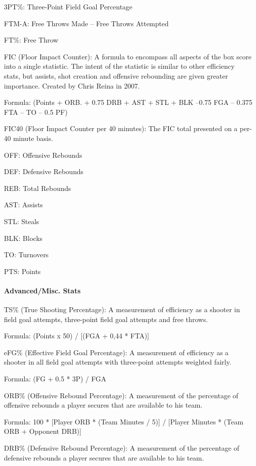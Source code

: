 \documentclass[]{article}
\let\oldparagraph\paragraph
\renewcommand{\paragraph}[1]{\oldparagraph{#1}\mbox{}}
\begin{document}
3PT\%: Three-Point Field Goal Percentage

FTM-A: Free Throws Made -- Free Throws Attempted

FT\%: Free Throw

FIC (Floor Impact Counter): A formula to encompass all aspects of the
box score into a single statistic. The intent of the statistic is
similar to other efficiency stats, but assists, shot creation and
offensive rebounding are given greater importance. Created by Chris
Reina in 2007.~

Formula: (Points + ORB. + 0.75 DRB + AST + STL + BLK --0.75 FGA -- 0.375
FTA -- TO -- 0.5 PF)

FIC40 (Floor Impact Counter per 40 minutes): The FIC total presented on
a per-40 minute basis.

OFF: Offensive Rebounds

DEF: Defensive Rebounds

REB: Total Rebounds

AST: Assists

STL: Steals

BLK: Blocks

TO: Turnovers

PTS: Points

\paragraph{Advanced/Misc. Stats}\label{advancedmisc.-stats}

TS\% (True Shooting Percentage): A measurement of efficiency as a
shooter in field goal attempts, three-point field goal attempts and free
throws.

Formula: (Points x 50) / {[}(FGA + 0,44 * FTA){]}

eFG\% (Effective Field Goal Percentage): A measurement of efficiency as
a shooter in all field goal attempts with three-point attempts weighted
fairly.

Formula: (FG + 0.5 * 3P) / FGA

ORB\% (Offensive Rebound Percentage): A measurement of the percentage of
offensive rebounds a player secures that are available to his team.~

Formula: 100 * {[}Player ORB * (Team Minutes / 5){]} / {[}Player Minutes
* (Team ORB + Opponent DRB){]}

DRB\% (Defensive Rebound Percentage): A measurement of the percentage of
defensive rebounds a player secures that are available to his team.
\end{document}
